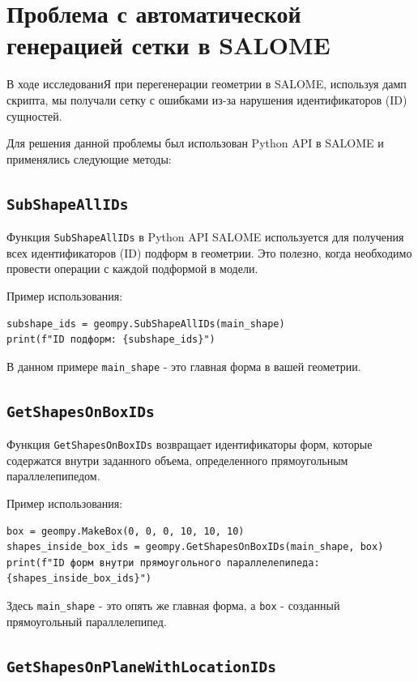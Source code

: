 \documentclass[a4paper,12pt]{article}
\theoremstyle{plain} %
\theoremstyle{definition} %
\theoremstyle{remark} %
\begin{document}
\section{Проблема с автоматической генерацией сетки в SALOME}

В ходе исследованиЯ при перегенерации геометрии в SALOME, используя дамп скрипта, мы получали сетку с ошибками из-за нарушения идентификаторов (ID) сущностей.

Для решения данной проблемы был использован Python API в SALOME и применялись следующие методы:
\subsection{\texttt{SubShapeAllIDs}}

Функция \texttt{SubShapeAllIDs} в Python API SALOME используется для получения всех идентификаторов (ID) подформ в геометрии. Это полезно, когда необходимо провести операции с каждой подформой в модели.

Пример использования:
\begin{verbatim}
subshape_ids = geompy.SubShapeAllIDs(main_shape)
print(f"ID подформ: {subshape_ids}")
\end{verbatim}

В данном примере \texttt{main\_shape} - это главная форма в вашей геометрии.

\subsection{\texttt{GetShapesOnBoxIDs}}

Функция \texttt{GetShapesOnBoxIDs} возвращает идентификаторы форм, которые содержатся внутри заданного объема, определенного прямоугольным параллелепипедом.

Пример использования:
\begin{verbatim}
box = geompy.MakeBox(0, 0, 0, 10, 10, 10)
shapes_inside_box_ids = geompy.GetShapesOnBoxIDs(main_shape, box)
print(f"ID форм внутри прямоугольного параллелепипеда: {shapes_inside_box_ids}")
\end{verbatim}

Здесь \texttt{main\_shape} - это опять же главная форма, а \texttt{box} - созданный прямоугольный параллелепипед.

\subsection{\texttt{GetShapesOnPlaneWithLocationIDs}}
\end{document}
